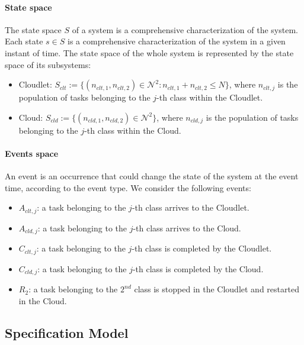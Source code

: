 \paragraph{State space}
The state space $S$ of a system is a comprehensive characterization of the system. Each state $s \in S$ is a comprehensive characterization of the system in a given instant of time.
The state space of the whole system is represented by the state space of its subsystems:

\begin{itemize}
	\item Cloudlet: $S_{clt} := \{(n_{clt,1},n_{clt,2})\in \mathcal{N}^{2}: n_{clt,1}+n_{clt,2}\leq N\}$, where $n_{clt,j}$ is the population of tasks belonging to the $j$-th class within the Cloudlet.
	
	\item Cloud: $S_{cld} := \{(n_{cld,1},n_{cld,2})\in \mathcal{N}^{2}\}$, where $n_{cld,j}$ is the population of tasks belonging to the $j$-th class within the Cloud.
\end{itemize}

\paragraph{Events space}
An event is an occurrence that could change the state of the system at the event time, according to the event type.
We consider the following events:

\begin{itemize}
	\item $A_{clt,j}$: a task belonging to the $j$-th class arrives to the Cloudlet.
	
	\item $A_{cld,j}$: a task belonging to the $j$-th class arrives to the Cloud.

	\item $C_{clt,j}$: a task belonging to the $j$-th class is completed by the Cloudlet.
	
	\item $C_{cld,j}$: a task belonging to the $j$-th class is completed by the Cloud.
	
	\item $R_{2}$: a task belonging to the $2^{nd}$ class is stopped in the Cloudlet and restarted in the Cloud.
\end{itemize}

\subsection{Specification Model}

